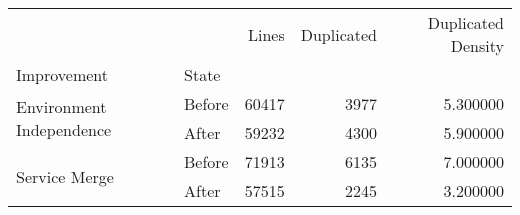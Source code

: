 \begin{tabular}{llrrr}
\toprule
 &  & Lines & Duplicated & Duplicated Density \\
Improvement & State &  &  &  \\
\midrule
\multirow[t]{2}{*}{Environment Independence} & Before & 60417 & 3977 & 5.300000 \\
 & After & 59232 & 4300 & 5.900000 \\
\cline{1-5}
\multirow[t]{2}{*}{Service Merge} & Before & 71913 & 6135 & 7.000000 \\
 & After & 57515 & 2245 & 3.200000 \\
\cline{1-5}
\bottomrule
\end{tabular}
